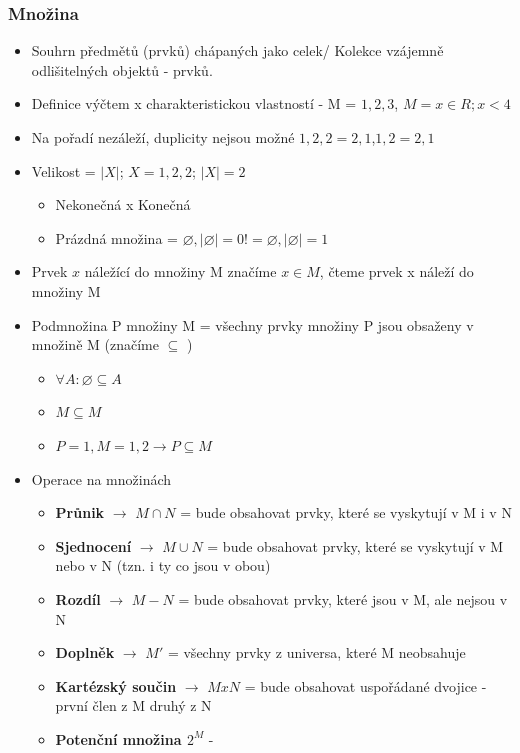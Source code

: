 \documentclass[10pt,a4paper]{article}
\begin{document}
\subsubsection{Množina}
\begin{itemize}
\item Souhrn předmětů (prvků) chápaných jako celek/ Kolekce vzájemně odlišitelných objektů - prvků.
\item Definice výčtem x charakteristickou vlastností - M = ${1,2,3}$, $M = {x\in R; x<4}$
\item Na pořadí nezáleží, duplicity nejsou možné ${1,2,2}={2,1}$,${1,2}={2,1}$
\item Velikost = $|X|$; $X = {1,2,2}$; $|X| = 2$
\begin{itemize}
\item Nekonečná x Konečná
\item Prázdná množina = $\varnothing ,|\varnothing | = 0 != {\varnothing }, |{\varnothing }| = 1$
\end{itemize}
\item Prvek $x$ náležící do množiny M značíme $x \in M$, čteme prvek x náleží do množiny M
\item Podmnožina P množiny M = všechny prvky množiny P jsou obsaženy v množině M (značíme $\subseteq$ )
\begin{itemize}
\item $\forall  A: \varnothing  \subseteq  A$
\item $M\subseteq M$
\item $P={1}, M={1,2} \rightarrow P\subseteq M$
\end{itemize}
\item Operace na množinách
\begin{itemize}
\item \textbf{Průnik} $\rightarrow$ $M \cap N$ = bude obsahovat prvky, které se vyskytují v M i v N
\item \textbf{Sjednocení} $\rightarrow$ $M \cup N$ = bude obsahovat prvky, které se vyskytují v M nebo v N (tzn. i ty co jsou v obou)
\item \textbf{Rozdíl} $\rightarrow$ $M - N$ = bude obsahovat prvky, které jsou v M, ale nejsou v N
\item \textbf{Doplněk} $\rightarrow$ $M'$ = všechny prvky z universa, které M neobsahuje
\item \textbf{Kartézský součin } $\rightarrow$ $M x N$ = bude obsahovat uspořádané dvojice - první člen z M druhý z N
\item \textbf{Potenční množina $2^M$} -
\end{itemize}
\end{itemize}
\end{document}
